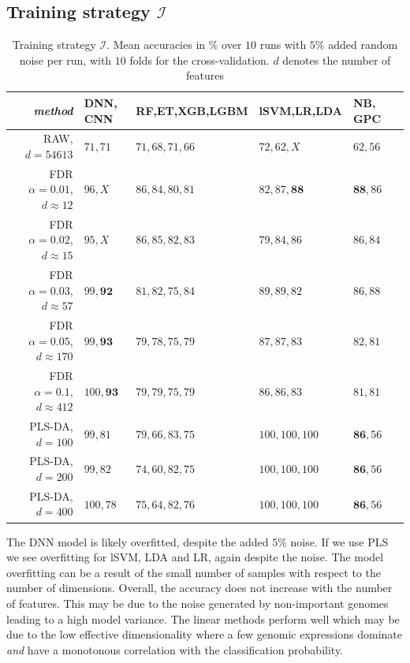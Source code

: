\documentclass[a4paper,10pt]{article}
\begin{document}
\subsection{Training strategy $\mathcal{I}$}
%
\begin{table}[htp]
\centering
\begin{tabular}{rlllll}

\textit{method}						& DNN, CNN 		& RF,ET,XGB,LGBM	&  lSVM,LR,LDA		& NB, GPC  			\\
							\hline
RAW, $d=54613$ 						& $71, 71$	 	&  $71, 68, 71, 66$	&  $72, 62, X$		&  $62, 56$  			\\
FDR $\alpha=0.01$, $d\approx 12$ 			& $96, X$  		&  $86, 84, 80, 81$	&  $82, 87, \mathbf{88}$&  $\mathbf{88}, 86$  		\\
FDR $\alpha=0.02$, $d\approx 15$ 			& $95, X$	  	&  $86, 85, 82, 83$	&  $79, 84, 86$		&  $86, 84$			\\
FDR $\alpha=0.03$, $d\approx 57$ 			& $99, \mathbf{92}$  	&  $81, 82, 75, 84$	&  $89, 89, 82$		&  $86, 88$			\\
FDR $\alpha=0.05$, $d\approx 170$ 			& $99, \mathbf{93}$  	&  $79, 78, 75, 79$	&  $87, 87, 83$		&  $82, 81$			\\
FDR $\alpha=0.1$,  $d\approx 412$ 			& $100,\mathbf{93}$	&  $79, 79, 75, 79$	&  $86, 86, 83$		&  $81, 81$			\\
PLS-DA, $d=100$ 					& $99, 81$		&  $79, 66, 83, 75$	&  $100, 100, 100$	&  $\mathbf{86}, 56$		\\
PLS-DA, $d=200$ 					& $99, 82$		&  $74, 60, 82, 75$	&  $100, 100, 100$  	&  $\mathbf{86}, 56$		\\
PLS-DA, $d=400$ 					& $100, 78$		&  $75, 64, 82, 76$	&  $100, 100, 100$  	&  $\mathbf{86}, 56$		
\end{tabular}
\caption{Training strategy $\mathcal{I}$. Mean accuracies in $\%$ over $10$ runs with $5\%$ added random noise per run, with $10$ folds for the cross-validation. $d$ denotes the number of features}
\label{tab:diversitymetrics}
\end{table}
%
The DNN model is likely overfitted, despite the added $5\%$ noise. If we use PLS we see overfitting for lSVM, LDA and LR, again despite the noise.
The model overfitting can be a result of the small number of samples with respect to the number of dimensions. Overall, the accuracy does not increase 
with the number of features. This may be due to the noise generated by non-important genomes leading to a high model variance. The linear methods perform well
which may be due to the low effective dimensionality where a few genomic expressions dominate \textit{and} have a monotonous correlation with the classification probability. \\ \\
\end{document}
